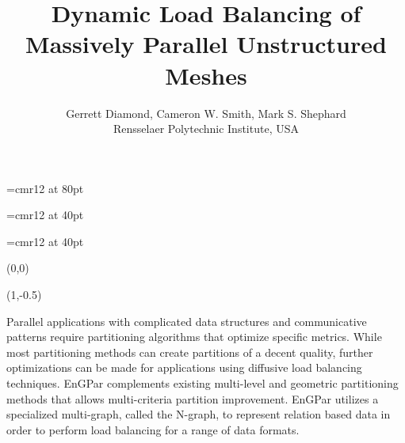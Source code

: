 \documentclass{beamer}
\begin{document}
\font\titlefont=cmr12 at 80pt
\title[]
{\titlefont
  Dynamic Load Balancing of \\[0.3cm]Massively Parallel Unstructured Meshes
}
\font\authorfont=cmr12 at 40pt
\author[G. Diamond]{\authorfont
  Gerrett Diamond, Cameron W. Smith, Mark S. Shephard\\
  Rensselaer Polytechnic Institute, USA}
\date{}
\font\abstractfont=cmr12 at 40pt
\begin{textblock}{15.8}(0,0)
  \titlepage
  \begin{textblock}{14}(1,-0.5)
    \begin{block}{
      \begin{center}
      \abstractfont
      Parallel applications with complicated data structures and communicative patterns
      require partitioning algorithms that optimize specific metrics. While most
      partitioning methods can create partitions of a decent quality, further
      optimizations can be made for applications using diffusive load balancing techniques.
      EnGPar complements existing multi-level and geometric partitioning methods that allows
      multi-criteria partition improvement. EnGPar utilizes a specialized multi-graph, called
      the N-graph, to represent relation based data in order to perform load balancing for a
      range of data formats.
              
      \end{center}}
    \end{block}
  \end{textblock}
\end{textblock}
\end{document}

